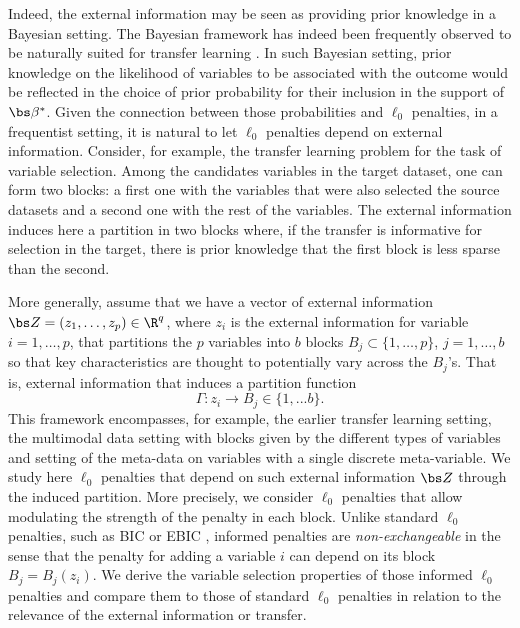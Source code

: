 \documentclass{article}
\begin{document}
Indeed, the external information may be seen as providing prior knowledge in a Bayesian setting. The Bayesian framework has indeed been frequently observed to be naturally suited for transfer learning \cite{telesca, dunson...}. In such Bayesian setting, prior knowledge on the likelihood of variables to be associated with the outcome would be reflected in the choice of prior probability for their inclusion in the support of $\bs \beta^*$. Given the connection between those probabilities and $\ell_0$ penalties, in a frequentist setting, it is natural to let $\ell_0$ penalties depend on external information. Consider, for example, the transfer learning problem for the task of variable selection. Among the candidates variables in the target dataset, one can form two blocks: a first one with the variables that were also selected the source datasets and a second one with the rest of the variables. The external information induces here a partition in two blocks where, if the transfer is informative for selection in the target, there is prior knowledge that the first block is less sparse than the second.

More generally, assume that we have a vector of external information $\bs Z=(z_1,\ldots,z_p) \in \R^q$, where $z_i$ is the external information for variable $i=1,\ldots,p$, that partitions the $p$ variables into $b$ blocks $B_j \subset \{1,\ldots,p\}$, $j=1,\ldots,b$ so that key characteristics are thought to potentially vary across the $B_j$'s. That is, external information that induces a partition function 
\begin{equation}\label{eq:partition}
    \Gamma: z_i \to B_j \in \{1,...b\}.
\end{equation}
This framework encompasses, for example, the earlier transfer learning setting, the multimodal data setting with blocks given by the different types of variables and setting of the meta-data on variables with a single discrete meta-variable. We study here $\ell_0$ penalties that depend on such external information $\bs Z$ through the induced partition. More precisely, we consider $\ell_0$ penalties that allow modulating the strength of the penalty in each block. Unlike standard $\ell_0$ penalties, such as BIC \citep{BIC} or EBIC \citep{EBIC}, informed penalties are \textit{non-exchangeable} in the sense that the penalty for adding a variable $i$ can depend on its block $B_j=B_j(z_i)$. We derive the variable selection properties of those informed $\ell_0$ penalties and compare them to those of standard $\ell_0$ penalties in relation to the relevance of the external information or transfer.
\end{document}
